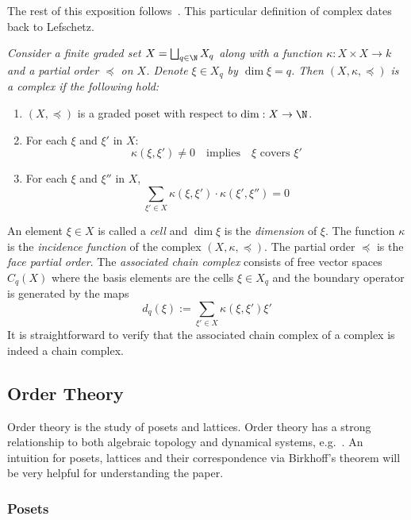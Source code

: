 The rest of this exposition follows~\cite{focm,mn}.  This particular definition of complex dates back to Lefschetz.

\begin{defn}
{\em
Consider a finite graded set $X = \bigsqcup_{q\in \N} X_q$ along with a function $\kappa:X\times X\to k$ and a partial order $\preceq$ on $X$. Denote $\xi\in X_q$ by $\dim \xi = q$.  Then $(X,\kappa,\preceq)$ is a {\em complex} if the following hold:
\begin{enumerate}
\item $(X,\preceq)$ is a graded poset with respect to $\dim:X\to \N$.
\item  For each $\xi$ and $\xi'$ in $X$:
$$\kappa(\xi,\xi')\neq 0\quad\text{implies}\quad \xi \text{ covers } \xi'$$
\item For each $\xi$ and $\xi''$ in $X$,
$$\sum_{\xi'\in X} \kappa(\xi,\xi')\cdot \kappa(\xi',\xi'')=0$$
\end{enumerate}
}
\end{defn}

An element $\xi\in X$ is called a {\em cell} and $\dim \xi$ is the {\em dimension} of $\xi$.  The function $\kappa$ is the {\em incidence function} of the complex $(X,\kappa,\preceq)$.   The partial order $\preceq$ is the {\em face partial order}. The {\em associated chain complex} consists of free vector spaces $C_q(X)$ where the basis elements are the cells $\xi \in X_q$ and the boundary operator is generated by the maps $$d_q( \xi) := \sum_{\xi' \in X} \kappa(\xi, \xi')\xi'$$ It is straightforward to verify that the associated chain complex of a complex is indeed a chain complex.











\subsection{Order Theory}\label{sec:prelims:order}

Order theory is the study of posets and lattices.  Order theory has a strong relationship to both algebraic topology and dynamical systems, e.g.~\cite{salamon,lsa,lsa2}.  An intuition for posets, lattices and their correspondence via Birkhoff's theorem will be very helpful for understanding the paper.


\subsubsection{Posets}

